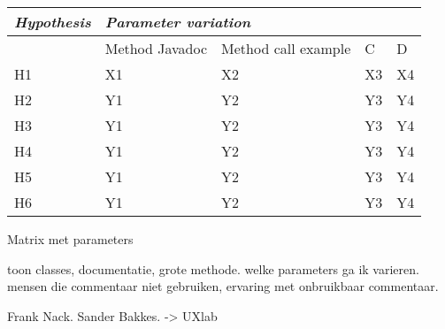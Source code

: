 \begin{tabular}{ *5l }
\emph{Hypothesis} & \multicolumn{4}{l}{\emph{Parameter variation}} \\
\hline
   & Method Javadoc  & Method call example  & C  & D  \\ 
H1 & X1 & X2 & X3 & X4 \\ 
H2 & Y1 & Y2 & Y3 & Y4 \\
H3 & Y1 & Y2 & Y3 & Y4 \\
H4 & Y1 & Y2 & Y3 & Y4 \\
H5 & Y1 & Y2 & Y3 & Y4 \\
H6 & Y1 & Y2 & Y3 & Y4 \\
\hline
\end{tabular}

Matrix met parameters

toon classes, documentatie, grote methode. welke parameters ga ik varieren. mensen die commentaar niet gebruiken, ervaring met onbruikbaar commentaar.

Frank Nack. Sander Bakkes. -> UXlab
